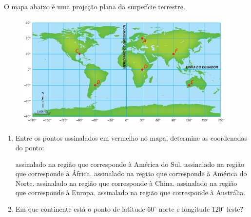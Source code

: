 \begin{enumerate}[label*=\protect\fbox{\arabic{enumi}}]
    O mapa abaixo é uma projeção plana da surpefície terrestre.

    \begin{figure}[H]
      \centering
      \includegraphics[width=1\linewidth]{figures/2.png}
    \end{figure}

    \begin{enumerate}[I]
      \item Entre os pontos assinalados em vermelho no mapa, determine as coordenadas do ponto:
        \begin{tasks}
          \task assinalado na região que corresponde à América do Sul.
          \task assinalado na região que corresponde à África.
          \task assinalado na região que corresponde à América do Norte.
          \task assinalado na região que corresponde à China.
          \task assinalado na região que corresponde à Europa.
          \task assinalado na região que corresponde à Austrália.
        \end{tasks}
      \item Em que continente está o ponto de latitude $60^\circ$ norte e longitude $120^\circ$ leste?
    \end{enumerate}
\end{enumerate}

